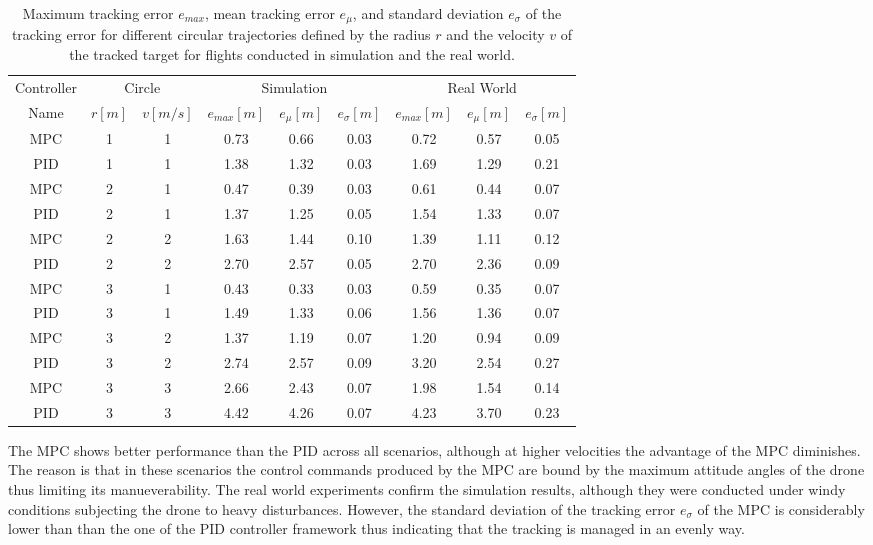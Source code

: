 \begin{table}[]
\center
\small
\caption{Maximum tracking error $e_{max}$, mean tracking error $e_{\mu}$, and standard deviation $e_{\sigma}$ of the tracking error for different circular trajectories defined by the radius $r$ and the velocity $v$ of the tracked target for flights conducted in simulation and the real world. \label{tab:circular_trajectory_evaluation_sim}}
\begin{tabular}{c cc ccc ccc}
\toprule
{Controller} & \multicolumn{2}{c}{{Circle}} & \multicolumn{3}{c}{{Simulation}} & \multicolumn{3}{c}{{Real World}} \\ 
\cmidrule(lr){1-1} \cmidrule(lr){2-3} \cmidrule(lr){4-6} \cmidrule(lr){7-9}
Name & $r [\si{m}]$ & $v [\si{m/s}]$ & $e_{max} [\si{m}]$ & $e_{\mu} [\si{m}]$ & $e_{\sigma} [\si{m}]$ & $e_{max} [\si{m}]$ & $e_{\mu} [\si{m}]$ & $e_{\sigma} [\si{m}]$ \\ 
\midrule 
MPC & 1 & 1 & 0.73 & 0.66 & 0.03 & 0.72 & 0.57 & 0.05 \\ 
PID & 1 & 1 & 1.38 & 1.32 & 0.03 & 1.69 & 1.29 & 0.21 \\ 
\midrule 
MPC & 2 & 1 & 0.47 & 0.39 & 0.03 & 0.61 & 0.44 & 0.07 \\ 
PID & 2 & 1 & 1.37 & 1.25 & 0.05 & 1.54 & 1.33 & 0.07 \\ 
\midrule 
MPC & 2 & 2 & 1.63 & 1.44 & 0.10 & 1.39 & 1.11 & 0.12 \\ 
PID & 2 & 2 & 2.70 & 2.57 & 0.05 & 2.70 & 2.36 & 0.09 \\ 
\midrule 
MPC & 3 & 1 & 0.43 & 0.33 & 0.03 & 0.59 & 0.35 & 0.07 \\ 
PID & 3 & 1 & 1.49 & 1.33 & 0.06 & 1.56 & 1.36 & 0.07 \\ 
\midrule 
MPC & 3 & 2 & 1.37 & 1.19 & 0.07 & 1.20 & 0.94 & 0.09 \\ 
PID & 3 & 2 & 2.74 & 2.57 & 0.09 & 3.20 & 2.54 & 0.27 \\ 
\midrule 
MPC & 3 & 3 & 2.66 & 2.43 & 0.07 & 1.98 & 1.54 & 0.14 \\ 
PID & 3 & 3 & 4.42 & 4.26 & 0.07 & 4.23 & 3.70 & 0.23 \\ 
\bottomrule 
\end{tabular} 
\end{table}










The MPC shows better performance than the PID across all scenarios, although at higher velocities the advantage of the MPC diminishes. The reason is that in these scenarios the  control commands produced by the MPC are bound by the maximum attitude angles of the drone thus limiting its manueverability. %
The real world experiments confirm the simulation results, although they were conducted under windy conditions subjecting the drone to heavy disturbances. However, the standard deviation of the tracking error $e_{\sigma}$ of the MPC is considerably lower than than the one of the PID controller framework thus indicating that the tracking is managed in an evenly way.

